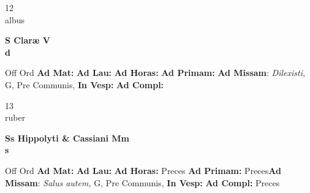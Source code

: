 \documentclass[10pt, openany]{book}
\begin{document}
    \begin{center}
        \begin{minipage}{3.5in}
            \vspace{2em}
            \begin{minipage}{0.5in}
                {\Huge 12} \\
                {\normalsize albus}
            \end{minipage}
            \begin{minipage}{3.0in}
                \textbf{ \large S Claræ V \\
                \textnormal{\normalsize d}}

            \end{minipage}
            \begin{justify}Off Ord
                \textbf{Ad Mat: }
                \textbf{Ad Lau: }
                \textbf{Ad Horas: }
                \textbf{Ad Primam: }\textbf{Ad Missam}: \textit{Dilexisti,} G, Pre Communis, 
                \textbf{In Vesp: }
                \textbf{Ad Compl: }
            \end{justify}
        \end{minipage}
    \end{center}

    \begin{center}
        \begin{minipage}{3.5in}
            \vspace{2em}
            \begin{minipage}{0.5in}
                {\Huge 13} \\
                {\normalsize ruber}
            \end{minipage}
            \begin{minipage}{3.0in}
                \textbf{ \large Ss Hippolyti \& Cassiani Mm \\
                \textnormal{\normalsize s}}

            \end{minipage}
            \begin{justify}Off Ord
                \textbf{Ad Mat: }
                \textbf{Ad Lau: }
                \textbf{Ad Horas: }Preces
                \textbf{Ad Primam: }Preces\textbf{Ad Missam}: \textit{Salus autem,} G, Pre Communis, 
                \textbf{In Vesp: }
                \textbf{Ad Compl: }Preces
            \end{justify}
        \end{minipage}
    \end{center}
\end{document}
